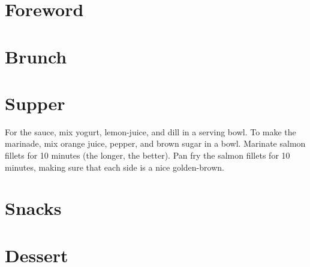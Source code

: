 \documentclass{recipe}
\begin{document}
\tableofcontents
\chapter{Foreword}


\chapter{Brunch}

\chapter{Supper}

For the sauce, mix yogurt, lemon-juice, and dill in a serving bowl. 
To make the marinade, mix orange juice, pepper, and brown sugar in a bowl. Marinate salmon fillets for 10 minutes (the longer, the better). Pan fry the salmon fillets for 10 minutes, making sure that each side is a nice golden-brown. 










\chapter{Snacks}

\chapter{Dessert}
\end{document}
